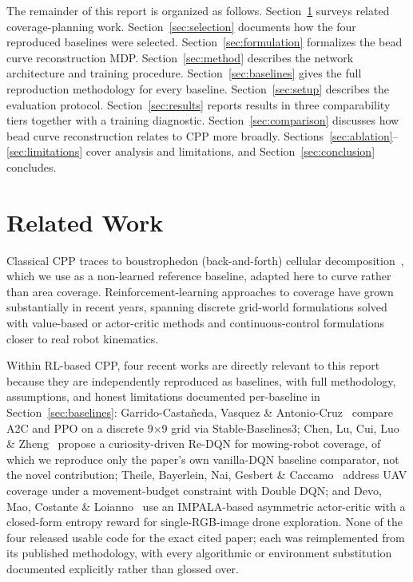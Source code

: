 \documentclass[conference]{IEEEtran}
\begin{document}
The remainder of this report is organized as follows. Section~\ref{sec:related} surveys related coverage-planning work. Section~\ref{sec:selection} documents how the four reproduced baselines were selected. Section~\ref{sec:formulation} formalizes the bead curve reconstruction MDP. Section~\ref{sec:method} describes the network architecture and training procedure. Section~\ref{sec:baselines} gives the full reproduction methodology for every baseline. Section~\ref{sec:setup} describes the evaluation protocol. Section~\ref{sec:results} reports results in three comparability tiers together with a training diagnostic. Section~\ref{sec:comparison} discusses how bead curve reconstruction relates to CPP more broadly. Sections~\ref{sec:ablation}--\ref{sec:limitations} cover analysis and limitations, and Section~\ref{sec:conclusion} concludes.

\section{Related Work}
\label{sec:related}

Classical CPP traces to boustrophedon (back-and-forth) cellular decomposition~\cite{choset2000coverage}, which we use as a non-learned reference baseline, adapted here to curve rather than area coverage. Reinforcement-learning approaches to coverage have grown substantially in recent years, spanning discrete grid-world formulations solved with value-based or actor-critic methods and continuous-control formulations closer to real robot kinematics.

Within RL-based CPP, four recent works are directly relevant to this report because they are independently reproduced as baselines, with full methodology, assumptions, and honest limitations documented per-baseline in Section~\ref{sec:baselines}: Garrido-Casta\~neda, Vasquez \& Antonio-Cruz~\cite{garrido2025rlcpp} compare A2C and PPO on a discrete 9$\times$9 grid via Stable-Baselines3; Chen, Lu, Cui, Luo \& Zheng~\cite{chen2025redqn} propose a curiosity-driven Re-DQN for mowing-robot coverage, of which we reproduce only the paper's own vanilla-DQN baseline comparator, not the novel contribution; Theile, Bayerlein, Nai, Gesbert \& Caccamo~\cite{theile2020uav} address UAV coverage under a movement-budget constraint with Double DQN; and Devo, Mao, Costante \& Loianno~\cite{devo2022autonomous} use an IMPALA-based asymmetric actor-critic with a closed-form entropy reward for single-RGB-image drone exploration. None of the four released usable code for the exact cited paper; each was reimplemented from its published methodology, with every algorithmic or environment substitution documented explicitly rather than glossed over.
\end{document}
